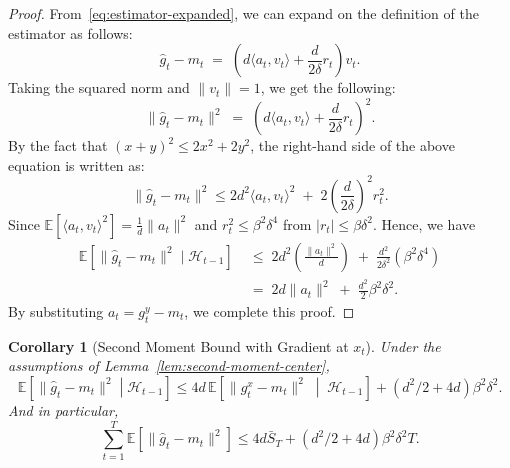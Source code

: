 \documentclass[journal,onecolumn]{IEEEtran}
\theoremstyle{plain}
\newtheorem{corollary}[theorem]{Corollary}
\theoremstyle{definition}
\theoremstyle{remark}
\begin{document}
{\begin{proof}
    From~\eqref{eq:estimator-expanded},  we can expand on the definition of the estimator as follows: 
    \begin{equation*}
        \hat g_{t}- m_{t}\;=\; \left( d\langle a_{t}, v_{t}\rangle + \frac{d}{2\delta}
        r_{t}\right) v_{t}.
    \end{equation*}
    Taking the squared norm and $\|v_{t}\|=1$, we get the following:
    \begin{equation*}
        \|\hat g_{t}- m_{t}\|^{2}\;=\; \left( d\langle a_{t}, v_{t}\rangle + \frac{d}{2\delta}
        r_{t}\right)^{2}.
    \end{equation*}
    By the fact that $(x+y)^{2}\le 2x^{2}+ 2y^{2}$, the right-hand side of the above equation is written as:
    \begin{equation*}
        \|\hat g_{t}- m_{t}\|^{2}\le 2d^{2}\langle a_{t}, v_{t}\rangle^{2}\;+\; 2
        \left(\frac{d}{2\delta}\right)^{2}r_{t}^{2}.
    \end{equation*}
    Since
    $\mathbb{E}[\langle a_{t}, v_{t}\rangle^{2}] = \frac{1}{d}\|a_{t}\|^{2}$ and
    $r_{t}^{2}\le \beta^{2}\delta^{4}$ from $|r_{t}| \le \beta\delta^{2}$. Hence,
    we have
    \begin{align*}
        \mathbb{E}\left[\|\hat g_{t}-m_{t}\|^{2}\mid \mathcal{H}_{t-1}\right] & \;\le\; 2d^{2}\left( \frac{\|a_{t}\|^{2}}{d}\right) \;+\; \frac{d^{2}}{2\delta^{2}}(\beta^{2}\delta^{4}) \\
        & \;=\; 2d\|a_{t}\|^{2}\;+\; \frac{d^{2}}{2}\beta^{2}\delta^{2}.
    \end{align*}
    By substituting $a_{t}= g_{t}^{y}- m_{t}$, we complete this proof.
\end{proof}

\begin{corollary}[Second Moment Bound with Gradient at $x_{t}$]
    \label{cor:second-moment-play} Under the assumptions of Lemma~\ref{lem:second-moment-center},
    \begin{equation*}
        \mathbb{E}\left[\|\hat g_{t}-m_{t}\|^{2}\middle| \mathcal{H}_{t-1}\right
        ] \le 4d\,\mathbb{E}\left[\|g_{t}^{x}-m_{t}\|^{2}\;\middle|\; \mathcal{H}
        _{t-1}\right] + (d^{2}/2+4d)\beta^{2}\delta^{2}.
    \end{equation*}
    And in particular,
    \begin{equation*}
        \sum_{t=1}^{T}\mathbb{E}\left[\|\hat g_{t}-m_{t}\|^{2}\right]\le 4d\bar S
        _{T}+ (d^{2}/2+4d)\beta^{2}\delta^{2}T.
    \end{equation*}
\end{corollary}

}
\end{document}
